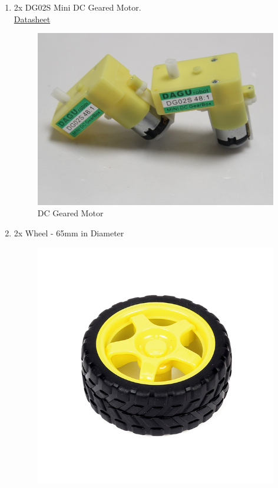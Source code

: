\documentclass[a4paper,12pt,oneside]{book}
\begin{document}
\begin{enumerate}
   \item 2x DG02S Mini DC Geared Motor.\\
   \href{http://cdn.sparkfun.com/datasheets/Robotics/DG02S.pdf}{ Datasheet}
   \begin{figure}[!ht]
        \centering
        \includegraphics[scale=0.3]{motor}
        \caption{DC Geared Motor}
      \end{figure}
\newpage
    \item 2x Wheel - 65mm in Diameter
    \begin{figure}[h]
        \centering
        \includegraphics[scale=0.22]{wheel}

\end{figure}
\end{enumerate}
\end{document}
